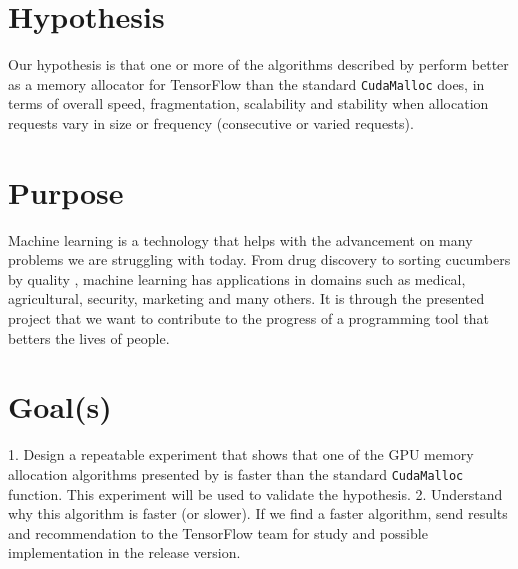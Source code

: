\documentclass[12pt,twoside]{article}
\begin{document}
\section{Hypothesis}
\label{sec:hypothesis}


Our hypothesis is that one or more of the algorithms described by \citeauthor{Vinkler2015} \cite{Vinkler2015} perform better as a memory allocator for TensorFlow than the standard \texttt{CudaMalloc} does, in terms of overall speed, fragmentation, scalability and stability when allocation requests vary in size or frequency (consecutive or varied requests).

\section{Purpose}
\label{sec:purpose}


Machine learning is a technology that helps with the advancement on many problems we are struggling with today. From drug discovery \cite{Ramsundar_Kearnes_Riley_Webster_Konerding_Pande_2015} to sorting cucumbers by quality \cite{cucumber}, machine learning has applications in domains such as medical, agricultural, security, marketing and many others. It is through the presented project that we want to contribute to the progress of a programming tool that betters the lives of people.

\section{Goal(s)}
\label{sec:goal(s)}


1. Design a repeatable experiment that shows that one of the GPU memory allocation algorithms presented by \citeauthor{Vinkler2015} \cite{Vinkler2015} is faster than the standard \texttt{CudaMalloc} function. This experiment will be used to validate the hypothesis. 2. Understand why this algorithm is faster (or slower).
If we find a faster algorithm, send results and recommendation to the TensorFlow team for study and possible implementation in the release version.
\end{document}

